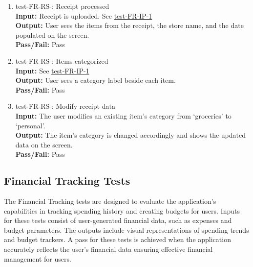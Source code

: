\documentclass[12pt, titlepage]{article}
\begin{document}
\begin{enumerate}
  \item test-FR-RS-: Receipt processed\\
    \textbf{Input:} Receipt is uploaded. See \hyperref[test-FR-IP-1]{test-FR-IP-1} \\
    \textbf{Output:} User sees the items from the receipt, the store name, and
    the date populated on the screen.\\
    \textbf{Pass/Fail:} Pass\\
  \item test-FR-RS-: Items categorized\\
    \textbf{Input:} See \hyperref[test-FR-IP-1]{test-FR-IP-1}\\
    \textbf{Output:} User sees a category label beside each item.\\
    \textbf{Pass/Fail:} Pass\\
  \item test-FR-RS-: Modify receipt data\\
    \textbf{Input:} The user modifies an existing item's category from `groceries' to `personal'.\\
    \textbf{Output:} The item's category is changed accordingly and shows the
    updated data on the screen.\\
    \textbf{Pass/Fail:} Pass\\
\end{enumerate}

\subsection{Financial Tracking Tests}
The Financial Tracking tests are designed to evaluate the application's capabilities in 
tracking spending history and creating budgets for users. Inputs for these tests consist 
of user-generated financial data, such as expenses and budget parameters. The outputs 
include visual representations of spending trends and budget trackers. A pass for these 
tests is achieved  when the application accurately reflects the user's financial data 
ensuring effective financial management for users.
\end{document}
